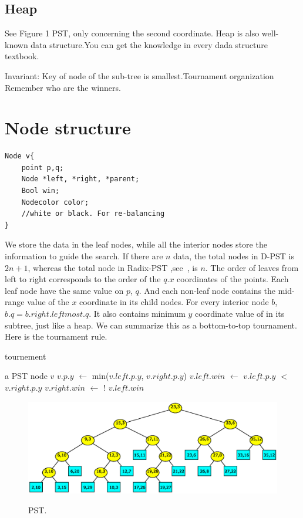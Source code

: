 \documentclass{acm_proc_article-sp}
\begin{document}
\subsection{Heap}
See Figure 1 PST, only concerning the second coordinate. Heap is
also well-known data structure.You can get the knowledge in every
dada structure textbook.

Invariant: Key of node of the sub-tree is smallest.Tournament
organization Remember who are the winners.

\section{Node structure}

\begin{verbatim}
Node v{
    point p,q;
    Node *left, *right, *parent;
    Bool win;
    Nodecolor color;
    //white or black. For re-balancing
}
\end{verbatim}
We store the data in the leaf nodes, while all the interior nodes
store the information to guide the search. If there are $n$ data,
the total nodes in D-PST is $2n+1$, whereas the total node in
Radix-PST ,see~\cite{Edward_04}, is $n$. The order of leaves from 
left to right corresponds
to the order of the $q.x$ coordinates of the points. Each leaf node
have the same value on $p$, $q$. And each non-leaf node contains the
mid-range value of the $x$ coordinate in its child nodes. For every
interior node $b$, $b.q = b.right.leftmost.q$. It also contains
minimum $y$ coordinate value of in its subtree, just like a heap. We
can summarize this as a bottom-to-top tournament. Here is the
tournament rule.
\begin{algorithm}[!h]
\caption{tournement} \label{alg:tournament}
	\begin{algorithmic}[1]
	\REQUIRE a PST node $v$
	\STATE $v.p.y$ $\leftarrow$ min($v.left.p.y$, $v.right.p.y$)
	\STATE $v.left.win$ $\leftarrow$ $v.left.p.y$ $<$ $v.right.p.y$
	\STATE $v.right.win$ $\leftarrow$ ! $v.left.win$
	\end{algorithmic}
\end{algorithm}

\begin{figure}[!h]
  \centering
  \includegraphics[scale=0.5]{pst}\\
  \caption{PST.}\label{fig:pst}
\end{figure}
\end{document}

